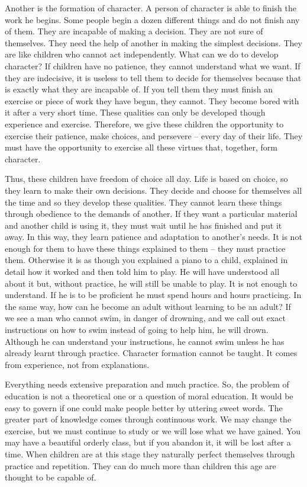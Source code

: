 \documentclass[lang=cn,10pt]{elegantbook}
\begin{document}
Another is the formation of character. A person of character is able to finish the work he begins. Some people begin a dozen different things and do not finish any of them. They are incapable of making a decision. They are not sure of themselves. They need the help of another in making the simplest decisions. They are like children who cannot act independently. What can we do to develop character? If children have no patience, they cannot understand what we want. If they are indecisive, it is useless to tell them to decide for themselves because that is exactly what they are incapable of. If you tell them they must finish an exercise or piece of work they have begun, they cannot. They become bored with it after
a very short time. These qualities can only be developed though experience and exercise. Therefore, we give these children the opportunity to exercise their patience, make choices, and persevere – every day of their life. They must have the opportunity to exercise all these virtues that, together, form character.

Thus, these children have freedom of choice all day. Life is based on choice, so they learn to make their own decisions. They decide and choose for themselves all the time and so they develop these qualities. They cannot learn these things through obedience to the demands of another. If they want a particular material and another child is using it, they must wait until he has finished and put it away. In this way, they learn patience and adaptation to another’s needs. It is not enough for them to have these things explained to them – they must practice them. Otherwise it is as though you explained a piano to a child, explained in detail how it worked and then told him to play. He will have understood all about it but, without practice, he will still be unable to play. It is not enough to understand. If he is to be proficient he must spend hours and hours practicing. In the same way, how can he become an adult without learning to be an adult? If we see a man who cannot swim, in danger of drowning, and we call out exact instructions on how to swim instead of going to
help him, he will drown. Although he can understand your instructions, he cannot swim unless he has already learnt through practice. Character formation cannot be taught. It comes from experience, not from explanations.

Everything needs extensive preparation and much practice. So, the problem of education is not a theoretical one or a question of moral education. It would be easy to govern if one could make people better by uttering sweet words. The greater part of knowledge comes through continuous work. We may change the exercise, but we must continue to study or we will lose what we have gained. You may have a beautiful orderly class, but if you abandon it, it will be lost after a time. When children are at this stage they naturally perfect themselves through practice and repetition. They can do much more than children this age are thought to be capable of.
\end{document}
